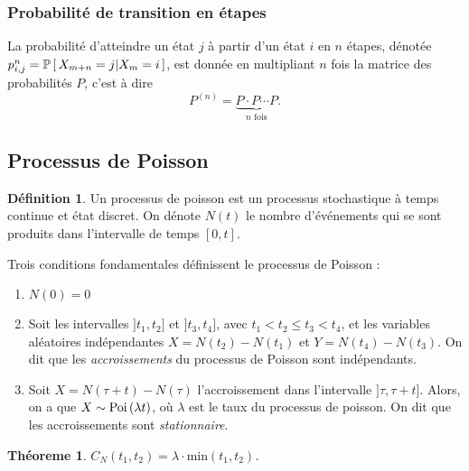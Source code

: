 \documentclass[11pt]{article}
\makeatletter
\newcommand\Pg[2]{%
	\ensuremath{%
		\mathbb{P}\left[\,#1\middle\rvert#2\,\right]%
	}%
}%
\newcommand\Poi[1]{%
	\ensuremath{%
		\mathrm{Poi}\left(#1\right)%
	}%
}%
\newtheorem{theoreme}{Théoreme}[section]
\theoremstyle{remark}
\theoremstyle{definition}
\newtheorem*{@definition}{Définition}
\newenvironment{definition}{%
	\begin{@definition}%
}{%
	\end{@definition}%
	\setcounter{property}{0}%
}
\makeatother
\begin{document}
\subsubsection{Probabilité de transition en  étapes}
La probabilité d'atteindre un état $j$ à partir d'un état $i$ en $n$ étapes,
dénotée $p_{i,j}^n=\Pg{X_{m+n}=j}{X_m=i}$, est donnée en multipliant $n$ fois
la matrice des probabilités $P$, c'est à dire
\begin{equation*}
	P^{(n)}=\underbrace{P\cdot P\cdots P}_{\text{$n$ fois}}.
\end{equation*}

% 
%
%
%

\subsection{Processus de Poisson}
\begin{definition}
	Un processus de poisson est un processus stochastique à temps continue et
	état discret. On dénote $N(t)$ le nombre d'événements qui se sont produits
	dans l'intervalle de temps $[0,t]$.

	Trois conditions fondamentales définissent le processus de Poisson :
	\begin{enumerate}
		\item $N(0)=0$
		\item Soit les intervalles $]t_1,t_2]$ et $]t_3,t_4]$, avec
		      $t_1<t_2\leq t_3<t_4$, et les variables aléatoires indépendantes
			  $X=N(t_2)-N(t_1)$ et $Y=N(t_4)-N(t_3)$. On dit que les
			  \textit{accroissements} du processus de Poisson sont
			  indépendants.
		\item Soit $X=N(\tau+t)-N(\tau)$ l'accroissement dans l'intervalle
		      $]\tau,\tau+t]$. Alors, on a que $X\sim\Poi{\lambda t}$, où
			  $\lambda$ est le taux du processus de poisson. On dit que les
			  accroissements sont \textit{stationnaire}.
	\end{enumerate}
\end{definition}

\begin{theoreme}
	$C_N(t_1,t_2)=\lambda\cdot\text{min}(t_1,t_2)$.
\end{theoreme}
\end{document}
